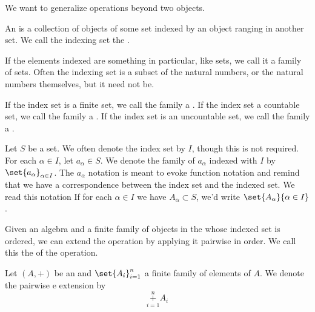 
\sbasic





\sstart



We want to generalize operations beyond
two objects.


An  is a collection of objects
of some set indexed by an object ranging
in another set.
We call the indexing set the
.

If the elements indexed are something
in particular, like sets, we call it a
family of sets.
Often the indexing set is a subset of
the natural numbers, or the natural numbers
themselves, but it need not be.

If the index set is a finite set,
we call the family a
.
If the index set a countable set,
we call the family a
.
If the index set is an uncountable set,
we call the family a
.

Let $S$ be a set.
We often denote the index set by $I$, though this is not required.
For each $\alpha \in I$, let $a_{\alpha} \in S$.
We denote the family of $a_{\alpha}$ indexed with $I$ by $\set{a_{\alpha}}_{\alpha \in I}$.
The $a_{\alpha}$ notation is meant to evoke function notation and remind that we have a correspondence between the index set and the indexed set.
We read this notation 
If for each $\alpha \in I$ we have $A_{\alpha} \subset S$, we'd write $\set{A_{\alpha}}{\alpha \in I}$.


Given an algebra and a finite family of objects
in the  whose indexed
set is ordered, we can extend the operation by
applying it pairwise in order. We call this the
 of the
operation.


Let $(A, +)$ be an  and
$\set{A_{i}}_{i=1}^{n}$ a finite family
of elements of $A$. We denote the pairwise e
extension by
\[
  \overset{n}{\underset{i=1}{+}} A_i
\]


